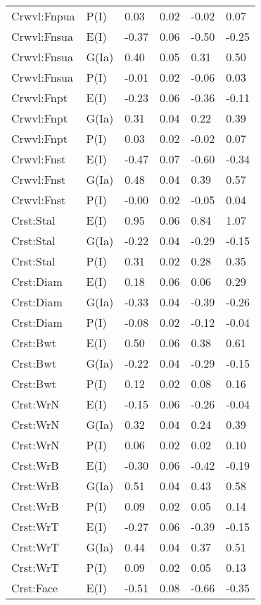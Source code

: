 \begin{center}
\begin{longtable}{|p{1.1in}|p{0.7in}|p{0.7in}|p{0.6in}|p{0.6in}|p{0.6in}|}
  Crwvl:Fnpua & P(I) & 0.03 & 0.02 & -0.02 & 0.07 \\ 
  Crwvl:Fnsua & E(I) & -0.37 & 0.06 & -0.50 & -0.25 \\ 
  Crwvl:Fnsua & G(Ia) & 0.40 & 0.05 & 0.31 & 0.50 \\ 
  Crwvl:Fnsua & P(I) & -0.01 & 0.02 & -0.06 & 0.03 \\ 
  Crwvl:Fnpt & E(I) & -0.23 & 0.06 & -0.36 & -0.11 \\ 
  Crwvl:Fnpt & G(Ia) & 0.31 & 0.04 & 0.22 & 0.39 \\ 
  Crwvl:Fnpt & P(I) & 0.03 & 0.02 & -0.02 & 0.07 \\ 
  Crwvl:Fnst & E(I) & -0.47 & 0.07 & -0.60 & -0.34 \\ 
  Crwvl:Fnst & G(Ia) & 0.48 & 0.04 & 0.39 & 0.57 \\ 
  Crwvl:Fnst & P(I) & -0.00 & 0.02 & -0.05 & 0.04 \\ 
  Crst:Stal & E(I) & 0.95 & 0.06 & 0.84 & 1.07 \\ 
  Crst:Stal & G(Ia) & -0.22 & 0.04 & -0.29 & -0.15 \\ 
  Crst:Stal & P(I) & 0.31 & 0.02 & 0.28 & 0.35 \\ 
  Crst:Diam & E(I) & 0.18 & 0.06 & 0.06 & 0.29 \\ 
  Crst:Diam & G(Ia) & -0.33 & 0.04 & -0.39 & -0.26 \\ 
  Crst:Diam & P(I) & -0.08 & 0.02 & -0.12 & -0.04 \\ 
  Crst:Bwt & E(I) & 0.50 & 0.06 & 0.38 & 0.61 \\ 
  Crst:Bwt & G(Ia) & -0.22 & 0.04 & -0.29 & -0.15 \\ 
  Crst:Bwt & P(I) & 0.12 & 0.02 & 0.08 & 0.16 \\ 
  Crst:WrN & E(I) & -0.15 & 0.06 & -0.26 & -0.04 \\ 
  Crst:WrN & G(Ia) & 0.32 & 0.04 & 0.24 & 0.39 \\ 
  Crst:WrN & P(I) & 0.06 & 0.02 & 0.02 & 0.10 \\ 
  Crst:WrB & E(I) & -0.30 & 0.06 & -0.42 & -0.19 \\ 
  Crst:WrB & G(Ia) & 0.51 & 0.04 & 0.43 & 0.58 \\ 
  Crst:WrB & P(I) & 0.09 & 0.02 & 0.05 & 0.14 \\ 
  Crst:WrT & E(I) & -0.27 & 0.06 & -0.39 & -0.15 \\ 
  Crst:WrT & G(Ia) & 0.44 & 0.04 & 0.37 & 0.51 \\ 
  Crst:WrT & P(I) & 0.09 & 0.02 & 0.05 & 0.13 \\ 
  Crst:Face & E(I) & -0.51 & 0.08 & -0.66 & -0.35 \\ 

\end{longtable}
\end{center}
